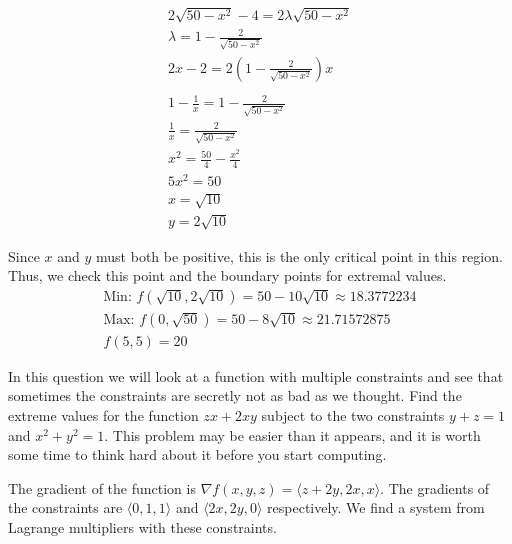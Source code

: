 \documentclass[12pt]{exam}
\begin{document}
\begin{questions}
\begin{parts}
\begin{solution}
\begin{multicols*}{2}
\begin{gather*}
                        2\sqrt{50 - x^2} - 4 = 2\lambda \sqrt{50 - x^2} \\
                        \lambda = 1 - \frac{2}{\sqrt{50 - x^2}} \\
                        2x - 2 = 2\left(1 - \frac{2}{\sqrt{50 - x^2}}\right)x \\\\
                        1 - \frac{1}{x} = 1 - \frac{2}{\sqrt{50 - x^2}} \\
                        \frac{1}{x} = \frac{2}{\sqrt{50 - x^2}} \\
                        x^2 = \frac{50}{4} - \frac{x^2}{4} \\
                        5x^2 = 50 \\
                        x = \sqrt{10} \\
                        y = 2\sqrt{10}
                    \end{gather*}
                \end{multicols*}
                
                Since $x$ and $y$ must both be positive, this is the only critical point in this region. Thus, we check this point and the boundary points for extremal values.
                \begin{gather*}
                    \text{Min: }\boxed{f(\sqrt{10}, 2\sqrt{10}) = 50 - 10\sqrt{10} \approx 18.3772234} \\
                    \text{Max: }\boxed{f(0, \sqrt{50}) = 50 - 8\sqrt{10} \approx{21.71572875}} \\
                    f(5, 5) = 20 \tag*{\qed}
                \end{gather*}
            \end{solution}
    \end{parts}
    \clearpage
\question In this question we will look at a function with multiple constraints and see that sometimes the constraints are secretly not as bad as we thought. Find the extreme values for the function $zx + 2xy$ subject to the two constraints $y + z = 1$ and $x^2 + y^2 = 1$. This problem may be easier than it appears, and it is worth some time to think hard about it before you start computing.
    \begin{solution}
        The gradient of the function is $\nabla f(x, y, z) = \langle z + 2y, 2x, x \rangle$. The gradients of the constraints are $\langle 0, 1, 1 \rangle$ and $\langle 2x, 2y, 0 \rangle$ respectively.
        We find a system from Lagrange multipliers with these constraints.
        

\end{solution}
\end{questions}
\end{document}
